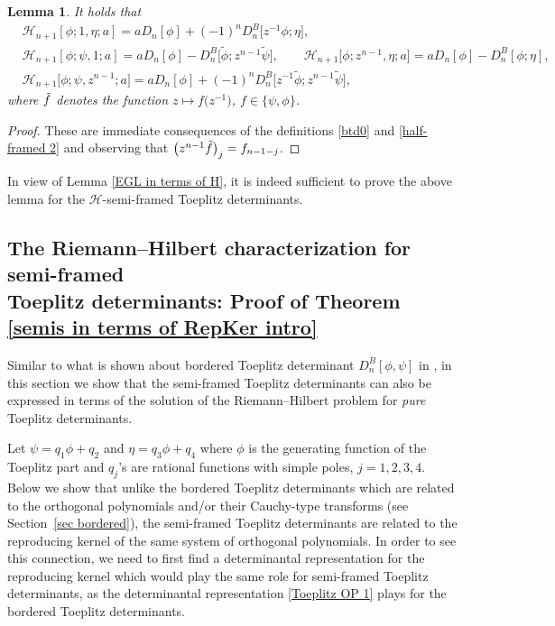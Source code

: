 \documentclass[10pt,a4paper]{amsart}
\numberwithin{equation}{section}
\newtheorem{Lemma}[Theorem]{Lemma}
 { \theoremstyle{definition}
\newtheorem{Definition}[Theorem]{Definition}
\newtheorem{Example}[Theorem]{Example}
\newtheorem{Remark}[Theorem]{Remark}
\newtheorem{Question}[Theorem]{Question}
}
\begin{document}
		\begin{Lemma}
			It holds that
			\begin{align*}
				& \mathscr{H}_{n+1}[\phi;1,\eta;a] = a D_{n}[\phi] + (-1)^{n} D^B_{n}\big[z^{-1}\phi;\eta\big], \\
				& \mathscr{H}_{n+1}[\phi;\psi,1;a] = a D_{n}[\phi] - D^B_{n}\big[\tilde{\phi};z^{n-1} \tilde{\psi}\big], \qquad \mathscr{H}_{n+1}\big[\phi;z^{n-1},\eta;a\big] = a D_{n}[\phi] - D^B_{n}[\phi;\eta], \\
				& \mathscr{H}_{n+1}\big[\phi;\psi,z^{n-1};a\big] = a D_{n}[\phi] + (-1)^n D^B_{n}\big[z^{-1}\tilde{\phi};z^{n-1} \tilde{\psi}\big],
			\end{align*}
			where $\Tilde{f}$ denotes the function $z \mapsto f\big(z^{-1}\big)$, $f \in \{\psi,\phi\}$.
		\end{Lemma}
		\begin{proof}
			These are immediate consequences of the definitions \eqref{btd0} and \eqref{half-framed 2} and observing that $\big( z^{n-1}\Tilde{f} \big)_j = f_{n-1-j}$.
		\end{proof}
		
		\begin{Remark}
		In view of Lemma \ref{EGL in terms of H}, it is indeed sufficient to prove the above lemma for the $\mathscr{H}$-semi-framed Toeplitz determinants.
		\end{Remark}
		
		\subsection[The Riemann--Hilbert characterization for semi-framed Toeplitz determinants:\\ Proof of Theorem 1.11]{The Riemann--Hilbert characterization for semi-framed \\ Toeplitz determinants: Proof of Theorem \ref{semis in terms of RepKer intro}}

		Similar to what is shown about bordered Toeplitz determinant $D^B_n[\phi,\psi]$ in \cite[Section 2]{BEGIL}, in this section we show that the semi-framed Toeplitz determinants can also be expressed in terms of the solution of the Riemann--Hilbert problem for \textit{pure} Toeplitz determinants.
		
		Let $\psi=q_1 \phi + q_2$ and $\eta=q_3 \phi + q_4$ where $\phi$ is the generating function of the Toeplitz part and $q_j$'s are rational functions with simple poles, $j=1,2,3,4$. Below we show that unlike the bordered Toeplitz determinants which are related to the orthogonal polynomials and/or their Cauchy-type transforms (see Section~\ref{sec bordered}), the semi-framed Toeplitz determinants are related to the reproducing kernel of the same system of orthogonal polynomials. In order to see this connection, we need to first find a determinantal representation for the reproducing kernel which would play the same role for semi-framed Toeplitz determinants, as the determinantal representation \eqref{Toeplitz OP 1} plays for the bordered Toeplitz determinants.
		
\end{document}
